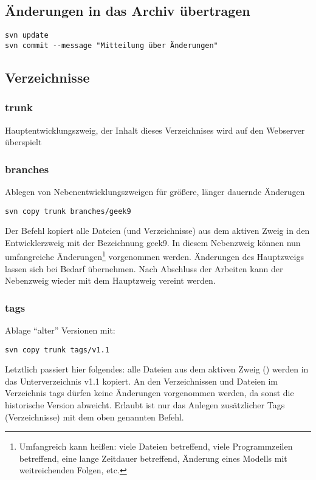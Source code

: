 \documentclass[
  final,      %
  idxtotoc,   %
  tocleft,    %
  a4paper,    %
  abstracton, %
  titlepage,  %
  oneside,    %
  DIVcalc
]{scrartcl}
\begin{document}
\subsection{Änderungen in das Archiv übertragen}
\begin{Verbatim}
svn update
svn commit --message "Mitteilung über Änderungen"
\end{Verbatim}


\subsection{Verzeichnisse}

\subsubsection{trunk}\label{sec:trunk}
Hauptentwicklungszweig, der Inhalt dieses Verzeichnises wird auf den
Webserver überspielt

\subsubsection{branches}
Ablegen von Nebenentwicklungszweigen für größere, länger dauernde
Änderugen

\begin{Verbatim}
svn copy trunk branches/geek9
\end{Verbatim}

Der Befehl kopiert alle Dateien (und Verzeichnisse) aus dem aktiven
Zweig in den Entwicklerzweig mit der Bezeichnung geek9. In diesem
Nebenzweig können nun umfangreiche Änderungen\footnote{Umfangreich kann
  heißen: viele Dateien betreffend, viele Programmzeilen betreffend,
  eine lange Zeitdauer betreffend, Änderung eines Modells mit
  weitreichenden Folgen, etc.}  vorgenommen werden. Änderungen des
Hauptzweigs lassen sich bei Bedarf übernehmen. Nach Abschluss der
Arbeiten kann der Nebenzweig wieder mit dem Hauptzweig vereint werden.

\subsubsection{tags}
Ablage \enquote{alter} Versionen mit:

\begin{Verbatim}
svn copy trunk tags/v1.1
\end{Verbatim}

Letztlich passiert hier folgendes: alle Dateien aus dem aktiven Zweig
() werden in das Unterverzeichnis v1.1 kopiert. An den
Verzeichnissen und Dateien im Verzeichnis tags dürfen keine Änderungen
vorgenommen werden, da sonst die historische Version abweicht. Erlaubt
ist nur das Anlegen zusätzlicher Tags (Verzeichnisse) mit dem oben
genannten Befehl.
\end{document}
